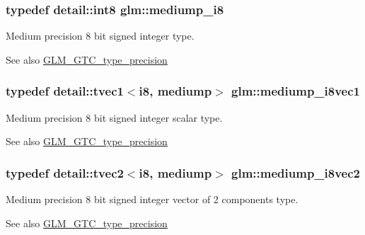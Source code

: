 \subsubsection[{\texorpdfstring{mediump\+\_\+i8}{mediump_i8}}]{\setlength{\rightskip}{0pt plus 5cm}typedef detail\+::int8 {\bf glm\+::mediump\+\_\+i8}}\hypertarget{group__gtc__type__precision_ga28a8b5fd51072680bb55178c17cc7411}{}\label{group__gtc__type__precision_ga28a8b5fd51072680bb55178c17cc7411}
Medium precision 8 bit signed integer type. \begin{DoxySeeAlso}{See also}
\hyperlink{group__gtc__type__precision}{G\+L\+M\+\_\+\+G\+T\+C\+\_\+type\+\_\+precision} 
\end{DoxySeeAlso}
\subsubsection[{\texorpdfstring{mediump\+\_\+i8vec1}{mediump_i8vec1}}]{\setlength{\rightskip}{0pt plus 5cm}typedef detail\+::tvec1$<$i8, mediump$>$ {\bf glm\+::mediump\+\_\+i8vec1}}\hypertarget{group__gtc__type__precision_ga820f8b497e06d518968d00761747c547}{}\label{group__gtc__type__precision_ga820f8b497e06d518968d00761747c547}
Medium precision 8 bit signed integer scalar type. \begin{DoxySeeAlso}{See also}
\hyperlink{group__gtc__type__precision}{G\+L\+M\+\_\+\+G\+T\+C\+\_\+type\+\_\+precision} 
\end{DoxySeeAlso}
\subsubsection[{\texorpdfstring{mediump\+\_\+i8vec2}{mediump_i8vec2}}]{\setlength{\rightskip}{0pt plus 5cm}typedef detail\+::tvec2$<$i8, mediump$>$ {\bf glm\+::mediump\+\_\+i8vec2}}\hypertarget{group__gtc__type__precision_ga38eba1ab306fe5cc5eeafa35ce5b5b26}{}\label{group__gtc__type__precision_ga38eba1ab306fe5cc5eeafa35ce5b5b26}
Medium precision 8 bit signed integer vector of 2 components type. \begin{DoxySeeAlso}{See also}
\hyperlink{group__gtc__type__precision}{G\+L\+M\+\_\+\+G\+T\+C\+\_\+type\+\_\+precision} 
\end{DoxySeeAlso}
